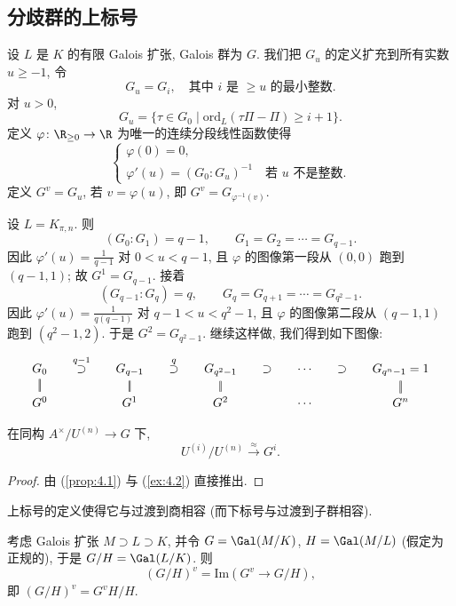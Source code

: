 \subsection*{分歧群的上标号}

设 $L$ 是 $K$ 的有限 Galois 扩张, Galois 群为 $G$. 我们把 $G_u$ 的定义扩充到所有实数 $u\ge -1$, 令
\[
G_u=G_i,\quad\text{其中 }i\text{ 是 }\ge u\text{ 的最小整数}.
\]
对 $u>0$,
\[
G_u=\{\tau\in G_0\mid\mathrm{ord}_L(\tau\varPi-\varPi)\ge i+1\}.
\]
定义 $\varphi\colon\R_{\ge 0}\to\R$ 为唯一的连续分段线性函数使得
\[
\begin{cases}
\varphi(0)=0,\\
\varphi'(u)=(G_0:G_u)^{-1}\quad\text{若 }u\text{ 不是整数}.
\end{cases}
\]
定义 $G^v=G_u$, 若 $v=\varphi(u)$, 即 $G^v=G_{\varphi^{-1}(v)}$.

\begin{example}\label{ex:4.2}
设 $L=K_{\pi,n}$. 则
\[
(G_0:G_1)=q-1,\qquad G_1=G_2=\cdots=G_{q-1}.
\]
因此 $\varphi'(u)=\frac{1}{q-1}$ 对 $0<u<q-1$, 且 $\varphi$ 的图像第一段从 $(0,0)$ 跑到 $(q-1,1)$; 故 $G^1=G_{q-1}$. 接着
\[
(G_{q-1}:G_q)=q,\qquad G_q=G_{q+1}=\cdots=G_{q^2-1}.
\]
因此 $\varphi'(u)=\frac{1}{q(q-1)}$ 对 $q-1<u<q^2-1$, 且 $\varphi$ 的图像第二段从 $(q-1,1)$ 跑到 $(q^2-1,2)$. 于是 $G^2=G_{q^2-1}$. 继续这样做, 我们得到如下图像:
\[
\begin{tikzcd}[column sep=small, row sep=small]
G_0 \ar[d, no head, double] & \overset{q-1}{\supset} & G_{q-1} \ar[d, no head, double] & \overset{q}{\supset} & G_{q^2-1} \ar[d, no head, double] & \supset & \cdots & \supset & G_{q^n-1}=1 \ar[d, no head, double] \\
G^0 & & G^1 & & G^2 & & \cdots & & G^n
\end{tikzcd}
\]
\end{example}

\begin{proposition}\label{prop:4.3}
在同构 $A^{\times}/U^{(n)}\to G$ 下,
\[
U^{(i)}/U^{(n)}\xrightarrow{\approx}G^i.
\]
\end{proposition}

\begin{proof}
由 (\ref{prop:4.1}) 与 (\ref{ex:4.2}) 直接推出.
\end{proof}

上标号的定义使得它与过渡到商相容 (而下标号与过渡到子群相容).

\begin{proposition}\label{prop:4.4}
考虑 Galois 扩张 $M\supset L\supset K$, 并令 $G=\Gal(M/K)$, $H=\Gal(M/L)$ (假定为正规的), 于是 $G/H=\Gal(L/K)$. 则
\[
(G/H)^v=\mathrm{Im}(G^v\to G/H),
\]
即 $(G/H)^v=G^vH/H$.
\end{proposition}

